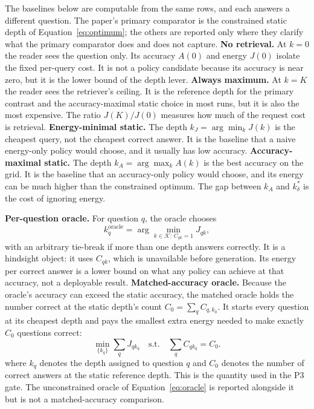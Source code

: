 \documentclass[a4paper,fleqn]{cas-sc}
\begin{document}
The baselines below are computable from the same rows, and each answers a different question. The paper's primary comparator is the constrained static depth of Equation~\eqref{eq:optimum}; the others are reported only where they clarify what the primary comparator does and does not capture. \textbf{No retrieval.} At $k=0$ the reader sees the question only. Its accuracy $A(0)$ and energy $J(0)$ isolate the fixed per-query cost. It is not a policy candidate because its accuracy is near zero, but it is the lower bound of the depth lever. \textbf{Always maximum.} At $k=K$ the reader sees the retriever's ceiling. It is the reference depth for the primary contrast and the accuracy-maximal static choice in most runs, but it is also the most expensive. The ratio $J(K)/J(0)$ measures how much of the request cost is retrieval. \textbf{Energy-minimal static.} The depth $k_{J}=\arg\min_{k}J(k)$ is the cheapest query, not the cheapest correct answer. It is the baseline that a naive energy-only policy would choose, and it usually has low accuracy. \textbf{Accuracy-maximal static.} The depth $k_{A}=\arg\max_{k}A(k)$ is the best accuracy on the grid. It is the baseline that an accuracy-only policy would choose, and its energy can be much higher than the constrained optimum. The gap between $k_{A}$ and $k^{*}_{\delta}$ is the cost of ignoring energy.

\textbf{Per-question oracle.} For question $q$, the oracle chooses
\begin{equation}\label{eq:oracle}
  k_{q}^{\mathrm{oracle}}=\arg\min_{k\in\mathcal{K}:\,C_{qk}=1}J_{qk},
\end{equation}
with an arbitrary tie-break if more than one depth answers correctly. It is a hindsight object: it uses $C_{qk}$, which is unavailable before generation. Its energy per correct answer is a lower bound on what any policy can achieve at that accuracy, not a deployable result. \textbf{Matched-accuracy oracle.} Because the oracle's accuracy can exceed the static accuracy, the matched oracle holds the number correct at the static depth's count $C_{0}=\sum_{q}C_{q,k_{0}}$. It starts every question at its cheapest depth and pays the smallest extra energy needed to make exactly $C_{0}$ questions correct:
\begin{equation}\label{eq:matched-oracle}
  \min_{\{k_{q}\}}\sum_{q}J_{qk_{q}}
  \quad\text{s.t.}\quad
  \sum_{q}C_{qk_{q}}=C_{0}.
\end{equation}
where $k_{q}$ denotes the depth assigned to question $q$ and $C_{0}$ denotes the number of correct answers at the static reference depth. This is the quantity used in the P3 gate. The unconstrained oracle of Equation~\eqref{eq:oracle} is reported alongside it but is not a matched-accuracy comparison.
\end{document}
